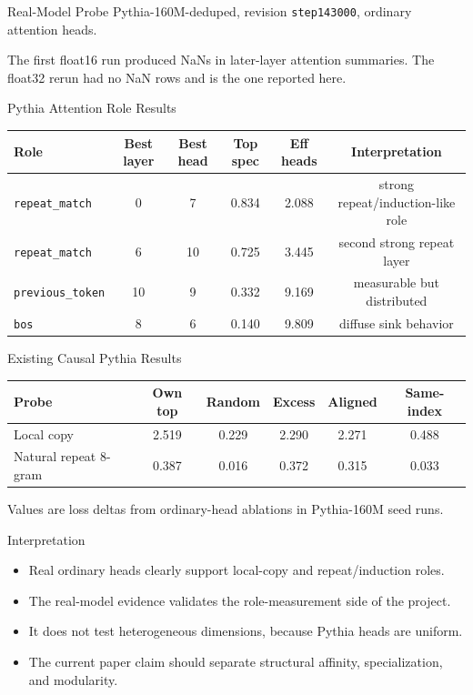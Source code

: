 \documentclass[aspectratio=169]{beamer}
\begin{document}
\begin{frame}{Real-Model Probe}
  \small
  Pythia-160M-deduped, revision \texttt{step143000}, ordinary attention heads.

  \vspace{0.25cm}
  The first float16 run produced NaNs in later-layer attention summaries.
  The float32 rerun had no NaN rows and is the one reported here.
\end{frame}

\begin{frame}{Pythia Attention Role Results}
  \scriptsize
  \begin{tabular}{lccccc}
    \toprule
    Role & Best layer & Best head & Top spec & Eff heads & Interpretation \\
    \midrule
    \texttt{repeat\_match} & 0 & 7 & 0.834 & 2.088 & strong repeat/induction-like role \\
    \texttt{repeat\_match} & 6 & 10 & 0.725 & 3.445 & second strong repeat layer \\
    \texttt{previous\_token} & 10 & 9 & 0.332 & 9.169 & measurable but distributed \\
    \texttt{bos} & 8 & 6 & 0.140 & 9.809 & diffuse sink behavior \\
    \bottomrule
  \end{tabular}
\end{frame}

\begin{frame}{Existing Causal Pythia Results}
  \scriptsize
  \begin{tabular}{lccccc}
    \toprule
    Probe & Own top & Random & Excess & Aligned & Same-index \\
    \midrule
    Local copy & 2.519 & 0.229 & 2.290 & 2.271 & 0.488 \\
    Natural repeat 8-gram & 0.387 & 0.016 & 0.372 & 0.315 & 0.033 \\
    \bottomrule
  \end{tabular}

  \vspace{0.35cm}
  Values are loss deltas from ordinary-head ablations in Pythia-160M seed runs.
\end{frame}

\begin{frame}{Interpretation}
  \small
  \begin{itemize}
    \item Real ordinary heads clearly support local-copy and repeat/induction roles.
    \item The real-model evidence validates the role-measurement side of the project.
    \item It does not test heterogeneous dimensions, because Pythia heads are uniform.
    \item The current paper claim should separate structural affinity, specialization, and modularity.
  \end{itemize}
\end{frame}
\end{document}
